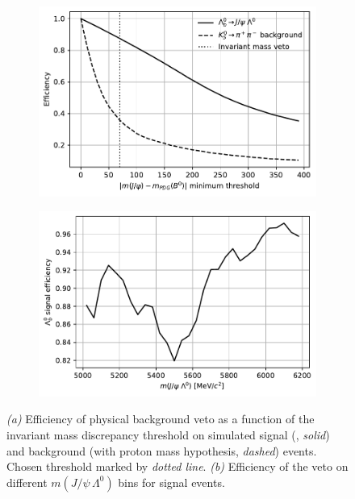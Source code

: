 \begin{figure}[t]
	\centering
	\begin{subfigure}{.45\textwidth}
		\includegraphics[height=.2\textheight]{graphics/04-event_selection/phys_veto_efficiencies.pdf}
		\caption{}
		\label{fig:4:phys_bkg_veto_eff_thres}
	\end{subfigure}
	\begin{subfigure}{.45\textwidth}
		\includegraphics[height=.2\textheight]{graphics/04-event_selection/phys_veto_sig_efficiencies_per_bin.pdf}
		\caption{}
		\label{fig:4:phys_bkg_veto_eff_mass}
	\end{subfigure}
	\caption{\textit{(a)} Efficiency of physical background veto as a function of the invariant mass discrepancy threshold on simulated signal (\demonstratorshort, \textit{solid}) and background (\physbkgshort with proton mass hypothesis, \textit{dashed}) events. Chosen threshold marked by \textit{dotted line}. \textit{(b)} Efficiency of the veto on different $m(J/\psi\,\Lambda^0)$ bins for \demonstratorshort signal events.}
	\label{fig:4:phys_bkg_veto_eff}
\end{figure}

